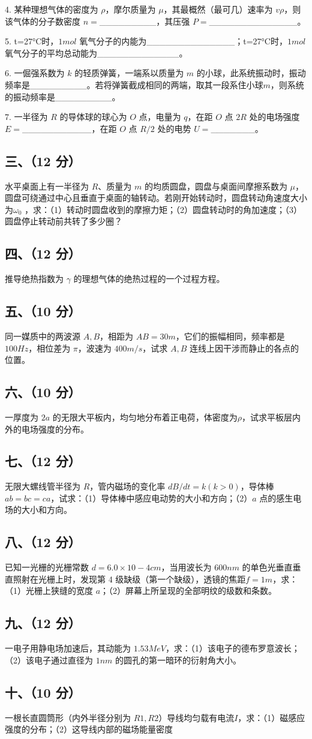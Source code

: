 4. 某种理想气体的密度为 $\rho$，摩尔质量为 $\mu$，其最概然（最可几）速率为 $v\rho$，则该气体的分子数密度 $n=$_________，其压强 $P=$______________。

5. t=27°C时，$1mol$ 氧气分子的内能为______________；t=27°C时，$1mol$ 氧气分子的平均总动能为_____________。

6. 一倔强系数为 $k$ 的轻质弹簧，一端系以质量为 $m$ 的小球，此系统振动时，振动频率是_________。若将弹簧截成相同的两端，取其一段系住小球$m$，则系统的振动频率是_________。

7. 一半径为 $R$ 的导体球的球心为 $O$ 点，电量为 $q$，在距 $O$ 点 $2R$ 处的电场强度$E=$___________，在距 $O$ 点 $R/2$ 处的电势 $U=$_______。
\subsection{三、（12 分）}
水平桌面上有一半径为 $R$、质量为 $m$ 的均质圆盘，圆盘与桌面间摩擦系数为 $\mu$，圆盘可绕通过中心且垂直于桌面的轴转动。若刚开始转动时，圆盘转动角速度大小为$\omega_0$ ，求：（1）转动时圆盘收到的摩擦力矩；（2）圆盘转动时的角加速度；（3）圆盘停止转动前共转了多少圈？
\subsection{四、（12 分）}
推导绝热指数为 $ \gamma $ 的理想气体的绝热过程的一个过程方程。
\subsection{五、（10 分）}
同一媒质中的两波源 $A,B$，相距为 $AB=30m$，它们的振幅相同，频率都是 $100Hz$，相位差为 $\pi$，波速为 $400m/s$，试求 $A,B$ 连线上因干涉而静止的各点的位置。
\subsection{六、（10 分）}
一厚度为 $2a$ 的无限大平板内，均匀地分布着正电荷，体密度为$\rho$，试求平板层内外的电场强度的分布。
\subsection{七、（12 分）}
无限大螺线管半径为 $R$，管内磁场的变化率 $dB/dt=k(k>0)$，导体棒 $ab=bc=ca$，试求：（1）导体棒中感应电动势的大小和方向；（2）$a$ 点的感生电场的大小和方向。
\subsection{八、（12 分）}
已知一光栅的光栅常数 $d=6.0\times10-4cm$，当用波长为 $600nm$ 的单色光垂直垂直照射在光栅上时，发现第 4 级缺级（第一个缺级），透镜的焦距$f=1m$，求：（1）光栅上狭缝的宽度 $a$；（2）屏幕上所呈现的全部明纹的级数和条数。
\subsection{九、（12 分）}
一电子用静电场加速后，其动能为 $1.53MeV$，求：（1）该电子的德布罗意波长；（2）该电子通过直径为 $1nm$ 的圆孔的第一暗环的衍射角大小。
\subsection{十、（10 分）}
一根长直圆筒形（内外半径分别为 $R1,R2$）导线均匀载有电流$I$，求：（1）磁感应强度的分布；（2）这导线内部的磁场能量密度